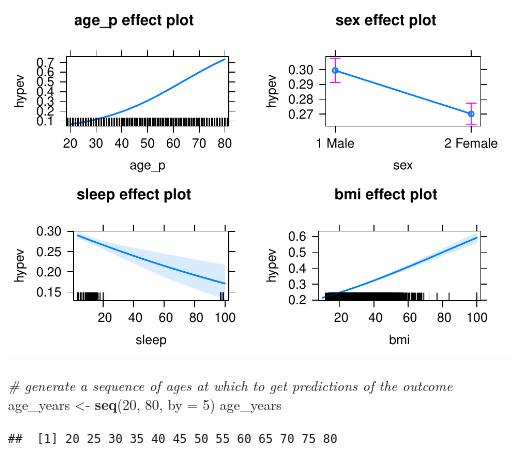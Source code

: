\documentclass[]{book}
\newenvironment{Shaded}{\begin{snugshade}}{\end{snugshade}}
\newcommand{\CommentTok}[1]{\textcolor[rgb]{0.56,0.35,0.01}{\textit{#1}}}
\newcommand{\DataTypeTok}[1]{\textcolor[rgb]{0.13,0.29,0.53}{#1}}
\newcommand{\DecValTok}[1]{\textcolor[rgb]{0.00,0.00,0.81}{#1}}
\newcommand{\KeywordTok}[1]{\textcolor[rgb]{0.13,0.29,0.53}{\textbf{#1}}}
\newcommand{\NormalTok}[1]{#1}
\newcommand{\OperatorTok}[1]{\textcolor[rgb]{0.81,0.36,0.00}{\textbf{#1}}}
\newcommand{\StringTok}[1]{\textcolor[rgb]{0.31,0.60,0.02}{#1}}
\begin{document}
\includegraphics{R/Rmodels/figures/unnamed-chunk-117-1.pdf}

\begin{Shaded}
\begin{Highlighting}[]
  \CommentTok{# generate a sequence of ages at which to get predictions of the outcome}
\NormalTok{  age_years <-}\StringTok{ }\KeywordTok{seq}\NormalTok{(}\DecValTok{20}\NormalTok{, }\DecValTok{80}\NormalTok{, }\DataTypeTok{by =} \DecValTok{5}\NormalTok{)}
\NormalTok{  age_years}
\end{Highlighting}
\end{Shaded}

\begin{verbatim}
##  [1] 20 25 30 35 40 45 50 55 60 65 70 75 80
\end{verbatim}

\begin{Shaded}
\end{Shaded}
\end{document}
